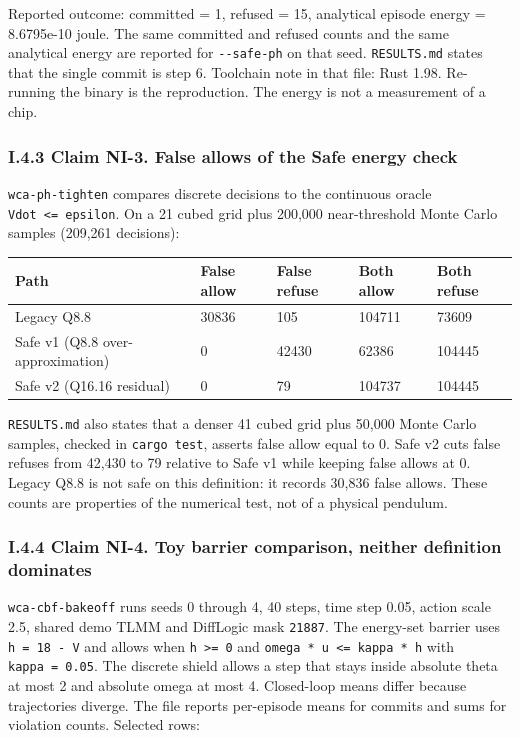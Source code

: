 \documentclass[
  10pt,
]{article}
\newcounter{none} %
\begin{document}
Reported outcome: committed = 1, refused = 15, analytical episode energy
= 8.6795e-10 joule. The same committed and refused counts and the same
analytical energy are reported for \texttt{-\/-safe-ph} on that seed.
\texttt{RESULTS.md} states that the single commit is step 6. Toolchain
note in that file: Rust 1.98. Re-running the binary is the reproduction.
The energy is not a measurement of a chip.

\subsubsection{I.4.3 Claim NI-3. False allows of the Safe energy
check}\label{i.4.3-claim-ni-3.-false-allows-of-the-safe-energy-check}

\texttt{wca-ph-tighten} compares discrete decisions to the continuous
oracle \texttt{Vdot\ \textless{}=\ epsilon}. On a 21 cubed grid plus
200,000 near-threshold Monte Carlo samples (209,261 decisions):

{\def\LTcaptype{none} %
\begin{longtable}[]{@{}lllll@{}}
\toprule\noalign{}
Path & False allow & False refuse & Both allow & Both refuse \\
\midrule\noalign{}
\endhead
\bottomrule\noalign{}
\endlastfoot
Legacy Q8.8 & 30836 & 105 & 104711 & 73609 \\
Safe v1 (Q8.8 over-approximation) & 0 & 42430 & 62386 & 104445 \\
Safe v2 (Q16.16 residual) & 0 & 79 & 104737 & 104445 \\
\end{longtable}
}

\texttt{RESULTS.md} also states that a denser 41 cubed grid plus 50,000
Monte Carlo samples, checked in \texttt{cargo\ test}, asserts false
allow equal to 0. Safe v2 cuts false refuses from 42,430 to 79 relative
to Safe v1 while keeping false allows at 0. Legacy Q8.8 is not safe on
this definition: it records 30,836 false allows. These counts are
properties of the numerical test, not of a physical pendulum.

\subsubsection{I.4.4 Claim NI-4. Toy barrier comparison, neither
definition
dominates}\label{i.4.4-claim-ni-4.-toy-barrier-comparison-neither-definition-dominates}

\texttt{wca-cbf-bakeoff} runs seeds 0 through 4, 40 steps, time step
0.05, action scale 2.5, shared demo TLMM and DiffLogic mask
\texttt{21887}. The energy-set barrier uses \texttt{h\ =\ 18\ -\ V} and
allows when \texttt{h\ \textgreater{}=\ 0} and
\texttt{omega\ *\ u\ \textless{}=\ kappa\ *\ h} with
\texttt{kappa\ =\ 0.05}. The discrete shield allows a step that stays
inside absolute theta at most 2 and absolute omega at most 4.
Closed-loop means differ because trajectories diverge. The file reports
per-episode means for commits and sums for violation counts. Selected
rows:
\end{document}

